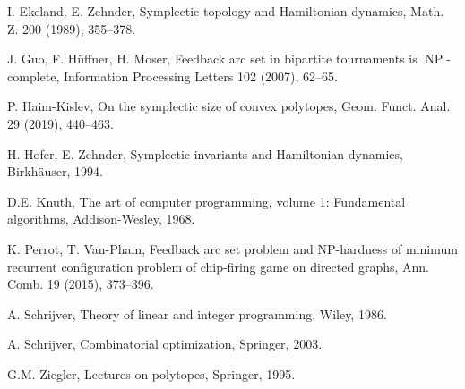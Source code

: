 \documentclass{amsart}
\DeclareMathOperator{\NP}{NP}
\begin{document}
%
%
%

\begin{thebibliography}{[99]}

I. Ekeland, E. Zehnder,
Symplectic topology and Hamiltonian dynamics,
Math. Z. 200 (1989), 355--378.

  J. Guo, F. H\"uffner, H. Moser,
  Feedback arc set in bipartite tournaments is $\NP$-complete,
  Information Processing Letters 102 (2007), 62--65.
  
P. Haim-Kislev,
On the symplectic size of convex polytopes,
Geom. Funct. Anal. 29 (2019), 440--463.

  H. Hofer, E. Zehnder,
  Symplectic invariants and Hamiltonian dynamics,
  Birkh\"auser, 1994.

D.E. Knuth,
The art of computer programming, volume 1: Fundamental algorithms,
Addison-Wesley, 1968.

K. Perrot, T. Van-Pham,
Feedback arc set problem and NP-hardness of minimum recurrent
configuration problem of chip-firing game on directed graphs,
Ann. Comb. 19 (2015), 373--396.
  
  A. Schrijver,
  Theory of linear and integer programming,
  Wiley, 1986.

  A. Schrijver,
  Combinatorial optimization,
  Springer, 2003.

  G.M. Ziegler,
  Lectures on polytopes,
  Springer, 1995.

\end{thebibliography}
\end{document}
